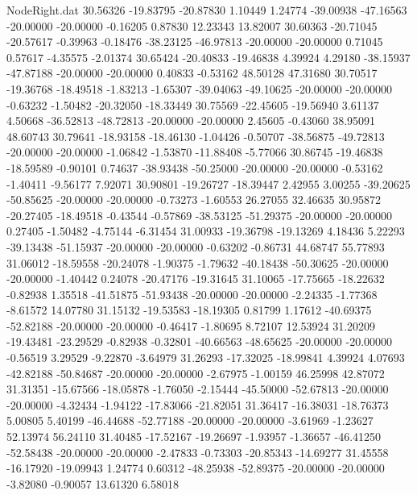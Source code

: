 \begin{filecontents}{NodeRight.dat}
  30.56326  -19.83795  -20.87830     1.10449    1.24774  -39.00938  -47.16563  -20.00000  -20.00000   -0.16205    0.87830   12.23343   13.82007
  30.60363  -20.71045  -20.57617    -0.39963   -0.18476  -38.23125  -46.97813  -20.00000  -20.00000    0.71045    0.57617   -4.35575   -2.01374
  30.65424  -20.40833  -19.46838     4.39924    4.29180  -38.15937  -47.87188  -20.00000  -20.00000    0.40833   -0.53162   48.50128   47.31680
  30.70517  -19.36768  -18.49518    -1.83213   -1.65307  -39.04063  -49.10625  -20.00000  -20.00000   -0.63232   -1.50482  -20.32050  -18.33449
  30.75569  -22.45605  -19.56940     3.61137    4.50668  -36.52813  -48.72813  -20.00000  -20.00000    2.45605   -0.43060   38.95091   48.60743
  30.79641  -18.93158  -18.46130    -1.04426   -0.50707  -38.56875  -49.72813  -20.00000  -20.00000   -1.06842   -1.53870  -11.88408   -5.77066
  30.86745  -19.46838  -18.59589    -0.90101    0.74637  -38.93438  -50.25000  -20.00000  -20.00000   -0.53162   -1.40411   -9.56177    7.92071
  30.90801  -19.26727  -18.39447     2.42955    3.00255  -39.20625  -50.85625  -20.00000  -20.00000   -0.73273   -1.60553   26.27055   32.46635
  30.95872  -20.27405  -18.49518    -0.43544   -0.57869  -38.53125  -51.29375  -20.00000  -20.00000    0.27405   -1.50482   -4.75144   -6.31454
  31.00933  -19.36798  -19.13269     4.18436    5.22293  -39.13438  -51.15937  -20.00000  -20.00000   -0.63202   -0.86731   44.68747   55.77893
  31.06012  -18.59558  -20.24078    -1.90375   -1.79632  -40.18438  -50.30625  -20.00000  -20.00000   -1.40442    0.24078  -20.47176  -19.31645
  31.10065  -17.75665  -18.22632    -0.82938    1.35518  -41.51875  -51.93438  -20.00000  -20.00000   -2.24335   -1.77368   -8.61572   14.07780
  31.15132  -19.53583  -18.19305     0.81799    1.17612  -40.69375  -52.82188  -20.00000  -20.00000   -0.46417   -1.80695    8.72107   12.53924
  31.20209  -19.43481  -23.29529    -0.82938   -0.32801  -40.66563  -48.65625  -20.00000  -20.00000   -0.56519    3.29529   -9.22870   -3.64979
  31.26293  -17.32025  -18.99841     4.39924    4.07693  -42.82188  -50.84687  -20.00000  -20.00000   -2.67975   -1.00159   46.25998   42.87072
  31.31351  -15.67566  -18.05878    -1.76050   -2.15444  -45.50000  -52.67813  -20.00000  -20.00000   -4.32434   -1.94122  -17.83066  -21.82051
  31.36417  -16.38031  -18.76373     5.00805    5.40199  -46.44688  -52.77188  -20.00000  -20.00000   -3.61969   -1.23627   52.13974   56.24110
  31.40485  -17.52167  -19.26697    -1.93957   -1.36657  -46.41250  -52.58438  -20.00000  -20.00000   -2.47833   -0.73303  -20.85343  -14.69277
  31.45558  -16.17920  -19.09943     1.24774    0.60312  -48.25938  -52.89375  -20.00000  -20.00000   -3.82080   -0.90057   13.61320    6.58018

\end{filecontents}
